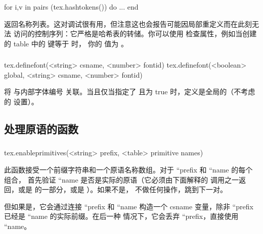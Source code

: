 \begin{typing}
for i,v in pairs (tex.hashtokens()) do ... end
\end{typing}

返回名称列表。这对调试很有用，但注意这也会报告可能因局部重定义而在此刻无法
访问的控制序列：它严格是哈希表的转储。你可以使用 
检查属性，例如当创建的 table 中的  键等于  时，
你的  值为 。

\subsubsection{}



\begin{typing}
tex.definefont(<string> csname, <number> fontid)
tex.definefont(<boolean> global, <string> csname, <number> fontid)
\end{typing}

将  与内部字体编号  关联。当且仅当指定了
 且为 true 时，定义是全局的（不考虑  的
设置）。

\subsection{处理原语的函数}\label{luaprimitives}

\subsubsection{}



\begin{typing}
tex.enableprimitives(<string> prefix, <table> primitive names)
\end{typing}

此函数接受一个前缀字符串和一个原语名称数组。对于 ``prefix 和
``name 的每个组合， 首先验证
``name 是否是实际的原语（它必须由下面解释的 
调用之一返回，或是  的一部分，或是 ）。如果不是，
 不做任何操作，跳到下一对。

但如果是，它会通过连接 ``prefix 和 ``name 构造一个 csname
变量，除非 ``prefix 已经是 ``name 的实际前缀。在后一种
情况下，它会丢弃 ``prefix，直接使用 ``name。

